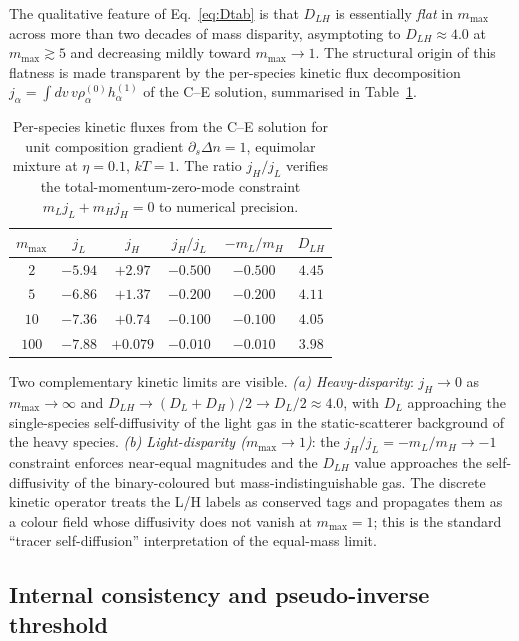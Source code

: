 \documentclass[aps,pre,twocolumn,superscriptaddress,longbibliography,floatfix]{revtex4-2}
\begin{document}
The qualitative feature of Eq.~\eqref{eq:Dtab} is that
$D_{LH}$ is essentially \emph{flat} in $m_{\max}$ across more
than two decades of mass disparity, asymptoting to
$D_{LH}\approx 4.0$ at $m_{\max}\gtrsim 5$ and decreasing
mildly toward $m_{\max}\to 1$. The structural origin of this
flatness is made transparent by the per-species kinetic flux
decomposition $j_\alpha=\int dv\,v\rho_\alpha^{(0)}h_\alpha^{(1)}$
of the C--E solution, summarised in Table~\ref{tab:jLjH}.
\begin{table}[htbp]
\caption{Per-species kinetic fluxes from the C--E solution for
unit composition gradient $\partial_s\Delta n=1$, equimolar
mixture at $\eta=0.1$, $kT=1$. The ratio $j_H/j_L$ verifies
the total-momentum-zero-mode constraint
$m_L j_L+m_H j_H=0$ to numerical precision.}
\label{tab:jLjH}
\centering
\begin{tabular}{c|ccccc}
\hline\hline
$m_{\max}$ & $j_L$ & $j_H$ & $j_H/j_L$ & $-m_L/m_H$ & $D_{LH}$ \\
\hline
$2$   & $-5.94$ & $+2.97$  & $-0.500$ & $-0.500$ & $4.45$ \\
$5$   & $-6.86$ & $+1.37$  & $-0.200$ & $-0.200$ & $4.11$ \\
$10$  & $-7.36$ & $+0.74$  & $-0.100$ & $-0.100$ & $4.05$ \\
$100$ & $-7.88$ & $+0.079$ & $-0.010$ & $-0.010$ & $3.98$ \\
\hline\hline
\end{tabular}
\end{table}
Two complementary kinetic limits are visible. \emph{(a)
Heavy-disparity}: $j_H\to 0$ as $m_{\max}\to\infty$ and
$D_{LH}\to (D_L+D_H)/2\to D_L/2\approx 4.0$, with $D_L$
approaching the single-species self-diffusivity of the light
gas in the static-scatterer background of the heavy species.
\emph{(b) Light-disparity ($m_{\max}\to 1$)}: the
$j_H/j_L=-m_L/m_H\to -1$ constraint enforces near-equal
magnitudes and the $D_{LH}$ value approaches the
self-diffusivity of the binary-coloured but
mass-indistinguishable gas. The discrete kinetic operator
treats the L/H labels as conserved tags and propagates them
as a colour field whose diffusivity does not vanish at
$m_{\max}=1$; this is the standard ``tracer
self-diffusion'' interpretation of the equal-mass limit.

\subsection{Internal consistency and pseudo-inverse threshold}
\label{sec:internal}
\end{document}
